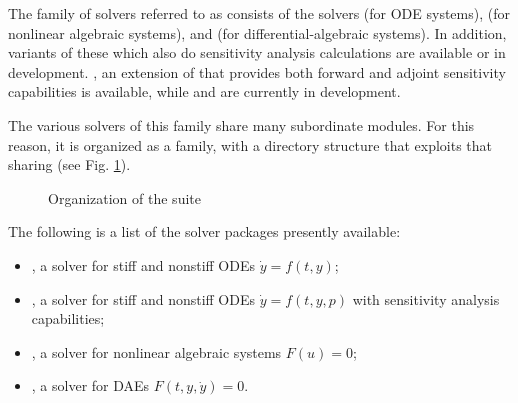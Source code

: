 %
The family of solvers referred to as {\sundials} consists of the solvers
{\cvode} (for ODE systems), {\kinsol} (for nonlinear algebraic
systems), and {\ida} (for differential-algebraic systems).  In addition,
variants of these which also do sensitivity analysis calculations are
available or in development. {\cvodes}, an extension of {\cvode} that
provides both forward and adjoint sensitivity capabilities is available,
while {\idas} and {\kinsols} are currently in development.

The various solvers of this family share many subordinate modules.
For this reason, it is organized as a family, with a directory
structure that exploits that sharing (see Fig. \ref{f:sunorg}).
\begin{figure}
\caption {Organization of the {\sundials} suite}\label{f:sunorg}
\end{figure}
The following is a list of the solver packages presently available:
\begin{itemize}

\item {\cvode},  
  a solver for stiff and nonstiff ODEs $\dot y = f(t,y)$;

\item {\cvodes},
  a solver for stiff and nonstiff ODEs $\dot y = f(t,y,p)$
  with sensitivity analysis capabilities;

\item {\kinsol}, 
  a solver for nonlinear algebraic systems $F(u) = 0$;

\item {\ida},
  a solver for DAEs $F(t,y,\dot y) = 0$.

\end{itemize}
